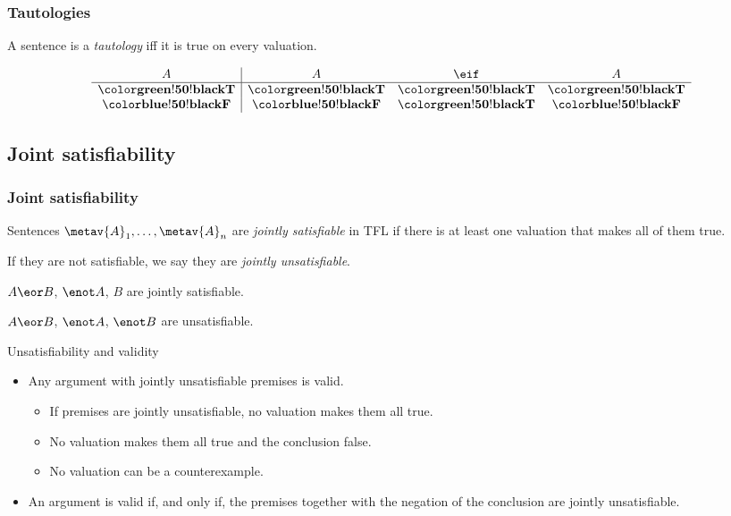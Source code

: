 \begin{frame}
\frametitle{Tautologies}

\begin{definition}
A sentence  is a \emph{tautology} iff it is true on every
valuation.
\end{definition}

\[\begin{array}{c|ccc}
A & A & \eif & A \\
\hline
\True & \True & \True & \True\\
\False & \False & \True & \False
\end{array}
\]
\end{frame}

\subsection{Joint satisfiability}

\begin{frame}
\frametitle{Joint satisfiability}

\begin{definition}
Sentences $\metav{A}_1, \dots, \metav{A}_n$ are \emph{jointly
satisfiable} in TFL if there is at least one valuation that makes all
of them true.

If they are not satisfiable, we say they are \emph{jointly unsatisfiable}.
\end{definition}

$A \eor B$, $\enot A$, $B$ are jointly satisfiable.

$A \eor B$, $\enot A$, $\enot B$ are  unsatisfiable.
\end{frame}

\begin{frame}{Unsatisfiability and validity}
  \begin{itemize}[<+->]
    \item Any argument with jointly unsatisfiable premises is valid.
    \begin{itemize}[<+->]
      \item If premises are jointly unsatisfiable, no valuation makes
      them all true.
      \item No valuation makes them all true and the conclusion false.
      \item No valuation can be a counterexample.
    \end{itemize}
    \item An argument is valid if, and only if, the premises together
    with the negation of the conclusion are jointly unsatisfiable.
  \end{itemize}
  
\end{frame}

